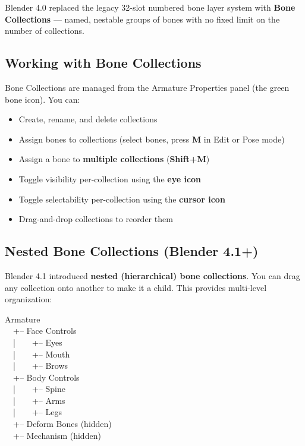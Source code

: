 Blender 4.0 replaced the legacy 32-slot numbered bone layer system with \textbf{Bone Collections} --- named, nestable groups of bones with no fixed limit on the number of collections.

\subsection{Working with Bone Collections}

Bone Collections are managed from the Armature Properties panel (the green bone icon). You can:

\begin{itemize}[leftmargin=2em]
  \item Create, rename, and delete collections
  \item Assign bones to collections (select bones, press \textbf{M} in Edit or Pose mode)
  \item Assign a bone to \textbf{multiple collections} (\textbf{Shift+M})
  \item Toggle visibility per-collection using the \textbf{eye icon}
  \item Toggle selectability per-collection using the \textbf{cursor icon}
  \item Drag-and-drop collections to reorder them
\end{itemize}

\subsection{Nested Bone Collections (Blender 4.1+)}

Blender 4.1 introduced \textbf{nested (hierarchical) bone collections}. You can drag any collection onto another to make it a child. This provides multi-level organization:

\begin{codebox}
Armature\\
~~+-- Face Controls\\
~~|~~~~+-- Eyes\\
~~|~~~~+-- Mouth\\
~~|~~~~+-- Brows\\
~~+-- Body Controls\\
~~|~~~~+-- Spine\\
~~|~~~~+-- Arms\\
~~|~~~~+-- Legs\\
~~+-- Deform Bones (hidden)\\
~~+-- Mechanism (hidden)
\end{codebox}


